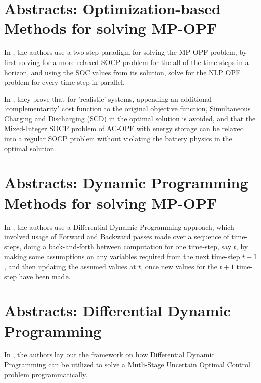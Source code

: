 \chapter{Abstracts: Optimization-based Methods for solving MP-OPF}
In \cite{Nazir2019Jun}, the authors use a two-step paradigm for solving the MP-OPF problem, by first solving for a more relaxed SOCP problem for the all of the time-steps in a horizon, and using the SOC values from its solution, solve for the NLP OPF problem for every time-step in parallel.

In \cite{Nazir2018Jun}, they prove that for 'realistic' systems, appending an additional `complementarity' cost function to the original objective function, Simultaneous Charging and Discharging (SCD) in the optimal solution is avoided, and that the Mixed-Integer SOCP problem of AC-OPF with energy storage can be relaxed into a regular SOCP problem without violating the battery physics in the optimal solution.

\chapter{Abstracts: Dynamic Programming Methods for solving MP-OPF}

In \cite{ddp_sugar_01}, the authors use a Differential Dynamic Programming approach, which involved usage of Forward and Backward passes made over a sequence of time-steps, doing a back-and-forth between computation for one time-step, say $t$, by making some assumptions on any variables required from the next time-step $t+1$, and then updating the assumed values at $t$, once new values for the $t+1$ time-step have been made.

\chapter{Abstracts: Differential Dynamic Programming}

In \cite{Qian2014Jul}, the authors lay out the framework on how Differential 
Dynamic Programming can be utilized to solve a Mutli-Stage Uncertain 
Optimal Control problem programmatically.



